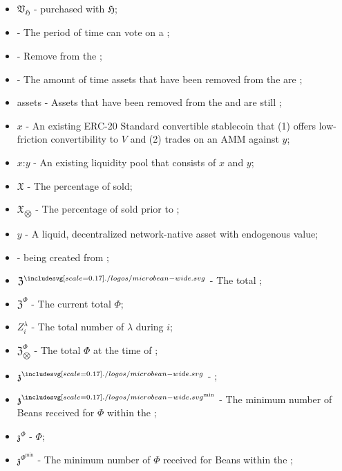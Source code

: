 \documentclass[class=article, crop=false]{standalone}
\begin{document}
\begin{itemize}[topsep=0pt, itemsep=3pt,leftmargin=16pt]
    \item[] $\mathfrak{V}_\mathfrak{H}$ -   purchased with  $\mathfrak{H}$;
    \item[]  - The period of time  can vote on a ;
    \item[]  - Remove from the ;
    \item[]   - The amount of time assets that have been removed from the  are ;
    \item[]  assets - Assets that have been removed from the  and are still ;
    \item[] $x$ - An existing ERC-20 Standard convertible stablecoin that (1) offers low-friction convertibility to $V$ and (2) trades on an AMM against $y$;
    \item[] $x$:$y$ - An existing liquidity pool that consists of $x$ and $y$;
    \item[] $\mathfrak{X}$ - The percentage of  sold;
    \item[] $\mathfrak{X}_{\bigotimes}$ - The percentage of  sold prior to ;
    \item[] $y$ - A liquid, decentralized network-native asset with endogenous value;
    \item[]  -  being created from  \Bean;
    \item[] $\mathfrak{Z}^{\bean}$ - The total  \Bean;
    \item[] $\mathfrak{Z}^{\Phi}$ - The current total  $\Phi$;
    \item[] $Z_i^{\lambda}$ - The total number of $\lambda$  during  $i$;
    \item[] $\mathfrak{Z}_{\bigotimes}^{\Phi}$ - The total  $\Phi$ at the time of ;
    \item[] $\mathfrak{z}^{\bean}$ -  \Bean;
    \item[] $\mathfrak{z}^{\bean^{\text{min}}}$ - The minimum number of  Beans received for    $\Phi$ within the ;
    \item[] $\mathfrak{z}^{\Phi}$ -  $\Phi$;
    \item[] $\mathfrak{z}^{\Phi^{\text{min}}}$ - The minimum number of  $\Phi$ received for    Beans within the ;

\end{itemize}
\end{document}
